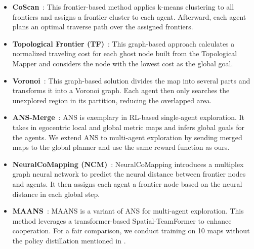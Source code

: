 

\begin{itemize}
\setlength{\parskip}{0pt} \setlength{\itemsep}{0pt plus 1pt}
 \item \textbf{CoScan}~\cite{CoScan}: This frontier-based method applies k-means clustering to all frontiers and assigns a frontier cluster to each agent. Afterward, each agent plans an optimal traverse path over the assigned frontiers.
 \item \textbf{Topological Frontier (TF)}~\cite{normalized_frontier}: This graph-based approach calculates a normalized traveling cost for each ghost node built from the Topological Mapper and considers the node with the lowest cost as the global goal.
 \item \textbf{Voronoi}~\cite{Voronoi}: This graph-based solution divides the map into several parts and transforms it into a Voronoi graph. Each agent then only searches the unexplored region in its partition, reducing the overlapped area.
 \item \textbf{ANS-Merge}~\cite{ans}: ANS is exemplary in RL-based single-agent exploration. It takes in egocentric local and global metric maps and infers global goals for the agents. We extend ANS to multi-agent exploration by sending merged maps to the global planner and use the same reward function as ours.
 \item\textbf{NeuralCoMapping (NCM)}~\cite{cvpr22}: NeuralCoMapping introduces a multiplex graph neural network to predict the neural distance between frontier nodes and agents. It then assigns each agent a frontier node based on the neural distance in each global step.
 \item \textbf{MAANS}~\cite{RL_multi2}: MAANS is a variant of ANS for multi-agent exploration. This method leverages a transformer-based Spatial-TeamFormer to enhance cooperation. For a fair comparison, we conduct training on 10 maps without the policy distillation mentioned in \cite{RL_multi2}.
\end{itemize}
